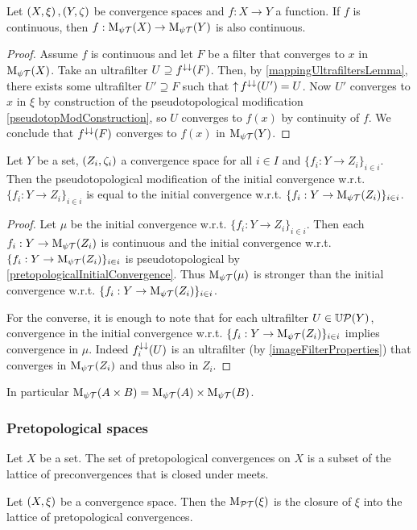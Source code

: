 \begin{proposition} \label{pseudotopModFunctorial}
Let $\left( X, \xi \right), \left( Y,\zeta \right)$ be convergence spaces and $f: X\to Y$ a function. If $f$ is continuous, then $f: \operatorname{M_{\psi\mathcal{T}}}(X)\to \operatorname{M_{\psi\mathcal{T}}}(Y)$ is also continuous.
\end{proposition}
\begin{proof}
Assume $f$ is continuous and let $F$ be a filter that converges to $x$ in $\operatorname{M_{\psi\mathcal{T}}}(X)$. Take an ultrafilter $U \supseteq f^{\downarrow\downarrow}(F)$. Then, by \ref{mappingUltrafiltersLemma}, there exists some ultrafilter $U'\supseteq F$ such that $\operatorname{\uparrow} f^{\downarrow\downarrow}(U') = U$. Now $U'$ converges to $x$ in $\xi$ by construction of the pseudotopological modification \ref{pseudotopModConstruction}, so $U$ converges to $f(x)$ by continuity of $f$. We conclude that $f^{\downarrow\downarrow}(F)$ converges to $f(x)$ in $\operatorname{M_{\psi\mathcal{T}}}(Y)$.
\end{proof}

\begin{proposition} \label{pseudotopologiserCommutesWithInitialStructure}
Let $Y$ be a set, $\left( Z_i, \zeta_i \right)$ a convergence space for all $i\in I$ and $\{f_i: Y\to Z_i\}_{i\in i}$. Then the pseudotopological modification of the initial convergence w.r.t. $\{f_i: Y\to Z_i\}_{i\in i}$ is equal to the initial convergence w.r.t. $\{f_i: Y\to \operatorname{M_{\psi\mathcal{T}}}(Z_i)\}_{i\in i}$.
\end{proposition}
\begin{proof}
Let $\mu$ be the initial convergence w.r.t. $\{f_i: Y\to Z_i\}_{i\in i}$. Then each $f_i: Y\to \operatorname{M_{\psi\mathcal{T}}}(Z_i)$ is continuous and the initial convergence w.r.t. $\{f_i: Y\to \operatorname{M_{\psi\mathcal{T}}}(Z_i)\}_{i\in i}$ is pseudotopological by \ref{pretopologicalInitialConvergence}. Thus $\operatorname{M_{\psi\mathcal{T}}}(\mu)$ is stronger than the initial convergence w.r.t. $\{f_i: Y\to \operatorname{M_{\psi\mathcal{T}}}(Z_i)\}_{i\in i}$.

For the converse, it is enough to note that for each ultrafilter $U\in \operatorname{\mathbb{U}\mathcal{P}}(Y)$, convergence in the initial convergence w.r.t. $\{f_i: Y\to \operatorname{M_{\psi\mathcal{T}}}(Z_i)\}_{i\in i}$ implies convergence in $\mu$. Indeed $f_i^{\downarrow\downarrow}(U)$ is an ultrafilter (by \ref{imageFilterProperties}) that converges in $\operatorname{M_{\psi\mathcal{T}}}(Z_i)$ and thus also in $Z_i$.
\end{proof}
In particular $\operatorname{M_{\psi\mathcal{T}}}(A\times B) = \operatorname{M_{\psi\mathcal{T}}}(A)\times \operatorname{M_{\psi\mathcal{T}}}(B)$.

\subsubsection{Pretopological spaces}
\begin{lemma}
Let $X$ be a set. The set of pretopological convergences on $X$ is a subset of the lattice of preconvergences that is closed under meets.
\end{lemma}
\begin{definition}
Let $\left( X,\xi \right)$ be a convergence space. Then the  $\operatorname{M_\mathcal{PT}}(\xi)$ is the closure of $\xi$ into the lattice of pretopological convergences.
\end{definition}


